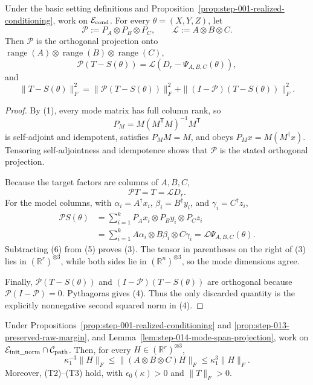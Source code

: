 \begin{lemma}
\label{lem:step-014-mode-span-projection}
Under the basic setting definitions and Proposition~\ref{prop:step-001-realized-conditioning}, work on
\(\mathcal E_{\rm cond}\). For every \(\theta=(X,Y,Z)\), let
\[
  \mathcal P:=P_A\otimes P_B\otimes P_C,
  \qquad \mathcal L:=A\otimes B\otimes C.
\]
Then \(\mathcal P\) is the orthogonal projection onto
\(\operatorname{range}(A)\otimes\operatorname{range}(B)\otimes
\operatorname{range}(C)\),
\[
  \mathcal P(T-S(\theta))
  =\mathcal L(D_r-\Psi_{A,B,C}(\theta)),                   \tag{3}
\]
and
\[
  \|T-S(\theta)\|_F^2
  =\|\mathcal P(T-S(\theta))\|_F^2
   +\|(I-\mathcal P)(T-S(\theta))\|_F^2.                 \tag{4}
\]

\end{lemma}

\begin{proof}
By (1), every mode matrix has full column rank, so
\[
  P_M=M(M^{\mathsf T}M)^{-1}M^{\mathsf T}
\]
is self-adjoint and idempotent, satisfies \(P_MM=M\), and obeys
\(P_Mx=M(M^\dagger x)\). Tensoring self-adjointness and idempotence shows that
\(\mathcal P\) is the stated orthogonal projection.

Because the target factors are columns of \(A,B,C\),
\[
  \mathcal PT=T=\mathcal LD_r.                            \tag{5}
\]
For the model columns, with
\(\alpha_i=A^\dagger x_i\), \(\beta_i=B^\dagger y_i\), and
\(\gamma_i=C^\dagger z_i\),
\[
\begin{aligned}
  \mathcal P S(\theta)
  &=\sum_{i=1}^k P_Ax_i\otimes P_By_i\otimes P_Cz_i\\
  &=\sum_{i=1}^k A\alpha_i\otimes B\beta_i\otimes C\gamma_i
   =\mathcal L\Psi_{A,B,C}(\theta).
\end{aligned}\tag{6}
\]
Subtracting (6) from (5) proves (3). The tensor in parentheses on the right
of (3) lies in \((\mathbb R^r)^{\otimes3}\), while both sides lie in
\((\mathbb R^n)^{\otimes3}\), so the mode dimensions agree.

Finally, \(\mathcal P(T-S(\theta))\) and
\((I-\mathcal P)(T-S(\theta))\) are orthogonal because
\(\mathcal P(I-\mathcal P)=0\). Pythagoras gives (4). Thus the only discarded
quantity is the explicitly nonnegative second squared norm in (4).


\end{proof}


\begin{proposition}
\label{prop:step-014-positive-physical-loss}
\leavevmode\par\noindent
Under Propositions~\ref{prop:step-001-realized-conditioning} and
\ref{prop:step-013-preserved-raw-margin}, and
Lemma~\ref{lem:step-014-mode-span-projection}, work on
\(\mathcal E_{\rm init\_norm}\cap\mathcal C_{\rm path}\). Then, for every
\(H\in(\mathbb R^r)^{\otimes3}\),
\[
  \kappa_1^{-3}\|H\|_F
  \le\|(A\otimes B\otimes C)H\|_F
  \le\kappa_1^3\|H\|_F.                                  \tag{7}
\]
Moreover, (T2)--(T3) hold, with
\(\epsilon_0(\kappa)>0\) and \(\|T\|_F>0\).

\end{proposition}

